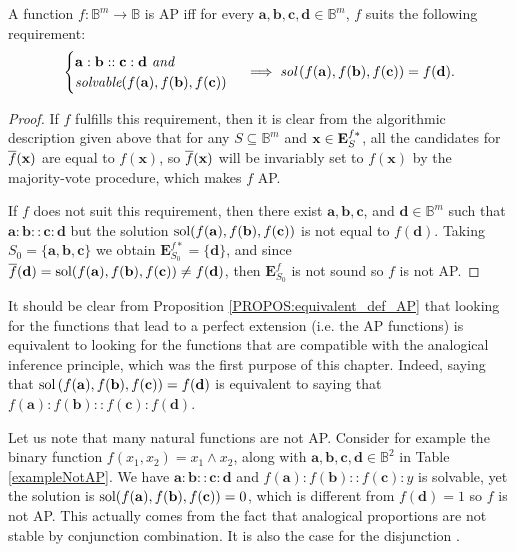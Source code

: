 \begin{proposition}
  \label{PROPOS:equivalent_def_AP}
  A function $f \colon \mathbb{B}^m \to \mathbb{B}$ is AP iff for every
  $\mathbf{a}, \mathbf{b}, \mathbf{c}, \mathbf{d} \in \mathbb{B}^m$, $f$ suits
  the following requirement:
  $$
  \begin{cases}
    \mathbf{a} :  \mathbf{b} ::  \mathbf{c} :  \mathbf{d} \emph{ and }\\
    \emph{solvable}(f(\mathbf{a}), f(\mathbf{b}),  f(\mathbf{c}))
  \end{cases}
  \implies \emph{sol}\left(f(\mathbf{a}),  f(\mathbf{b}),  f(\mathbf{c})\right) =
  f(\mathbf{d}). $$
\end{proposition}
\begin{proof}
  If $f$ fulfills  this requirement, then it is clear from the algorithmic
  description given above that for any $S \subseteq \mathbb{B}^m$ and
  $\mathbf{x} \in \mathbf{E}_{S}^{f*}$, all the candidates for $\overline{f}(\mathbf{x})$ are equal
  to $f(\mathbf{x})$, so $\overline{f}(\mathbf{x})$ will be invariably set to
  $f(\mathbf{x})$ by the majority-vote procedure, which makes $f$ AP.

If $f$ does not suit this requirement, then there exist $\mathbf{a},
  \mathbf{b}, \mathbf{c}$, and $\mathbf{d} \in \mathbb{B}^m$ such that
  $\mathbf{a} : \mathbf{b} :: \mathbf{c} : \mathbf{d}$ but the solution
  $\text{sol}(f(\mathbf{a}), f(\mathbf{b}), f(\mathbf{c}))$ is not equal to
  $f(\mathbf{d})$. Taking $S_0 = \{\mathbf{a}, \mathbf{b}, \mathbf{c}\}$ we
  obtain $\mathbf{E}^{f*}_{S_0} = \{\mathbf{d}\}$, and since $\overline{f}(\mathbf{d})
  = \text{sol}(f(\mathbf{a}), f(\mathbf{b}), f(\mathbf{c})) \neq f(\mathbf{d})$, then
  $\mathbf{E}_{S_0}^f$ is not sound so $f$ is not AP.
\end{proof}

\noindent
It should be clear from Proposition \ref{PROPOS:equivalent_def_AP} that looking
for the functions that lead to a perfect extension (i.e. the AP functions) is
equivalent to looking for the functions that are compatible with the analogical
inference principle, which was the first purpose of this chapter. Indeed,
saying that $\text{sol}\left(f(\mathbf{a}),  f(\mathbf{b}),
f(\mathbf{c})\right) =f(\mathbf{d})$ is equivalent to saying that
$f(\mathbf{a}) : f(\mathbf{b}) ::  f(\mathbf{c}) :  f(\mathbf{d})$.

Let us note that many natural functions are not AP. Consider for example the
binary function $f(x_1,x_2)= x_1 \wedge x_2$, along with $\mathbf{a},
\mathbf{b}, \mathbf{c}, \mathbf{d} \in \mathbb{B}^2$ in Table
\ref{exampleNotAP}.  We have $\mathbf{a} : \mathbf{b} :: \mathbf{c} :
\mathbf{d}$ and $f(\mathbf{a}) : f(\mathbf{b}) :: f(\mathbf{c}) : y$ is
solvable, yet the solution is $\text{sol}(f(\mathbf{a}), f(\mathbf{b}),
f(\mathbf{c}))=0$, which  is different from $f(\mathbf{d})=1$ so $f$ is not AP.
This actually comes from the fact that analogical proportions are not stable by
conjunction combination. It is also the case for the disjunction
\cite{PraRic14}.

